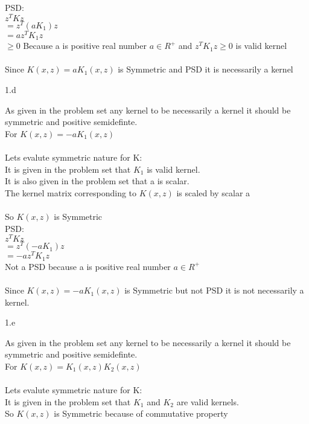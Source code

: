   PSD: \\
  $z^TKz$ \\
  $ = z^T(aK_1)z$ \\
  $ = az^TK_1z$ \\
  $\geq 0$   Because a is positive real number $a \in R^+$  and $ z^TK_1z \geq 0$ is valid kernel\\ \\
  
 Since  $K(x,z) = aK_1(x,z) $ is Symmetric and PSD it is necessarily a kernel

\clearpage

\LARGE
1.d
\normalsize

  As given in the problem set any kernel to be necessarily a kernel it should be symmetric and positive semidefinte.\\ 
  For $K(x,z) = -aK_1(x,z) $ \\ \\
  Lets evalute symmetric nature for K: \\
  It is given in the problem set that $K_1$ is valid kernel. \\
  It is also given in the problem set that a is scalar. \\
  The kernel matrix corresponding to $K(x,z) $ is scaled by scalar a \\ \\ 
  So $K(x,z)$ is Symmetric\\
  
  PSD: \\
  $z^TKz$ \\
  $ = z^T(-aK_1)z$ \\
  $ = -az^TK_1z$ \\
 Not a PSD because a is positive real number $a \in R^+$  \\ \\
  
 Since  $K(x,z) = -aK_1(x,z) $ is Symmetric but not PSD it is not necessarily a kernel.
\clearpage

\LARGE
1.e
\normalsize

  As given in the problem set any kernel to be necessarily a kernel it should be symmetric and positive semidefinte.\\ 
  For $K(x,z) =K_1(x,z)K_2(x,z) $ \\ \\
  Lets evalute symmetric nature for K: \\
  It is given in the problem set that $K_1$ and $K_2$ are valid kernels. \\
  So $K(x,z)$ is Symmetric because of commutative property\\
  

